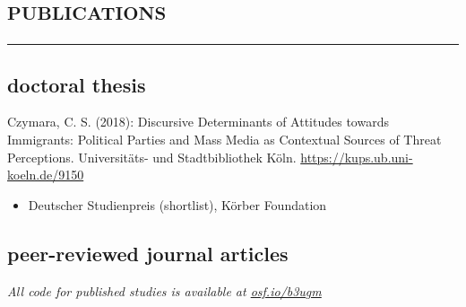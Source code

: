 \documentclass[11pt, a4paper]{article}
\begin{document}
\section*{\textsc{publications}}
\vskip-20pt{\noindent\rule{\textwidth}{1pt}}
\subsection*{doctoral thesis}
Czymara, C. S. (2018): Discursive Determinants of Attitudes towards Immigrants: Political Parties and Mass Media as Contextual Sources of Threat Perceptions. Universitäts- und Stadtbibliothek Köln. \href{https://kups.ub.uni-koeln.de/9150}{https://kups.ub.uni-koeln.de/9150}
\begin{itemize}
	\item Deutscher Studienpreis (shortlist), Körber Foundation
\end{itemize}
\hspace{1em}
\subsection*{peer-reviewed journal articles}
\textit{All code for published studies is available at \href{https://osf.io/b3ugm}{osf.io/b3ugm}}\\
\end{document}
